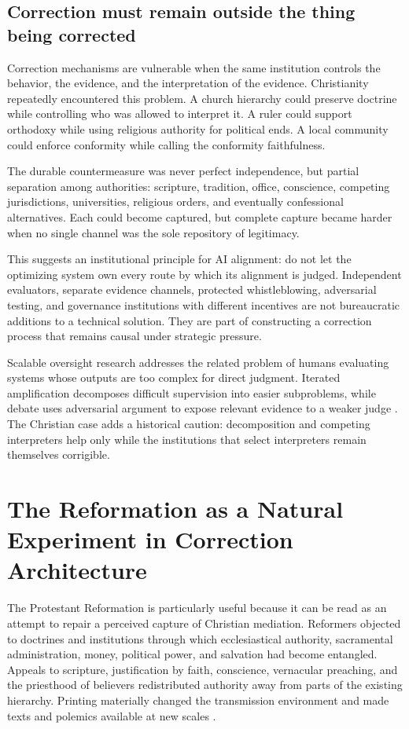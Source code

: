 \documentclass[11pt]{article}
\begin{document}
\subsection{Correction must remain outside the thing being corrected}

Correction mechanisms are vulnerable when the same institution controls the behavior, the evidence, and the interpretation of the evidence. Christianity repeatedly encountered this problem. A church hierarchy could preserve doctrine while controlling who was allowed to interpret it. A ruler could support orthodoxy while using religious authority for political ends. A local community could enforce conformity while calling the conformity faithfulness.

The durable countermeasure was never perfect independence, but partial separation among authorities: scripture, tradition, office, conscience, competing jurisdictions, universities, religious orders, and eventually confessional alternatives. Each could become captured, but complete capture became harder when no single channel was the sole repository of legitimacy.

This suggests an institutional principle for AI alignment: do not let the optimizing system own every route by which its alignment is judged. Independent evaluators, separate evidence channels, protected whistleblowing, adversarial testing, and governance institutions with different incentives are not bureaucratic additions to a technical solution. They are part of constructing a correction process that remains causal under strategic pressure.

Scalable oversight research addresses the related problem of humans evaluating systems whose outputs are too complex for direct judgment. Iterated amplification decomposes difficult supervision into easier subproblems, while debate uses adversarial argument to expose relevant evidence to a weaker judge \parencite{christiano2018amplification,irving2018debate}. The Christian case adds a historical caution: decomposition and competing interpreters help only while the institutions that select interpreters remain themselves corrigible.

\section{The Reformation as a Natural Experiment in Correction Architecture}

The Protestant Reformation is particularly useful because it can be read as an attempt to repair a perceived capture of Christian mediation. Reformers objected to doctrines and institutions through which ecclesiastical authority, sacramental administration, money, political power, and salvation had become entangled. Appeals to scripture, justification by faith, conscience, vernacular preaching, and the priesthood of believers redistributed authority away from parts of the existing hierarchy. Printing materially changed the transmission environment and made texts and polemics available at new scales \parencite{macculloch2003reformation,pettegree2017print}.
\end{document}
